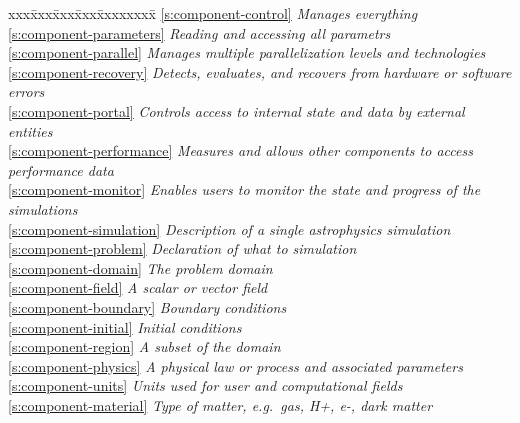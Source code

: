 \begin{tabbing}
xxx\=xxx\=xxx\=xxx\=xxxxxxxx\= \kill
\ref{s:component-control} \>           \>\>\>\> \textit{Manages everything}  \\
\ref{s:component-parameters} \>\>        \>\>\> \textit{Reading and accessing all parametrs} \\
\ref{s:component-parallel}  \>\>          \>\>\> \textit{Manages multiple parallelization levels and technologies} \\
\ref{s:component-recovery}  \>\>          \>\>\> \textit{Detects, evaluates, and recovers from hardware or software errors} \\
\ref{s:component-portal}  \>\>            \>\>\> \textit{Controls access to internal state and data by external entities} \\
\ref{s:component-performance}  \>\>       \>\>\> \textit{Measures and allows other components to access performance data} \\
\ref{s:component-monitor}  \>\>           \>\>\> \textit{Enables users to monitor the state and progress of the simulations} \\
\ref{s:component-simulation}  \>        \>\>\>\> \textit{Description of a single astrophysics simulation} \\
\ref{s:component-problem}  \>\>           \>\>\> \textit{Declaration of what to simulation} \\
\ref{s:component-domain}  \>\>\>            \>\> \textit{The problem domain} \\
\ref{s:component-field}  \>\>\>             \>\> \textit{A scalar or vector field} \\
\ref{s:component-boundary}  \>\>\>          \>\> \textit{Boundary conditions} \\
\ref{s:component-initial}  \>\>\>           \>\> \textit{Initial conditions} \\
\ref{s:component-region}  \>\>\>\>            \> \textit{A subset of the domain} \\
\ref{s:component-physics}  \>\>           \>\>\> \textit{A physical law or process and associated parameters} \\
\ref{s:component-units}  \>\>\>             \>\> \textit{Units used for user and computational fields} \\
\ref{s:component-material}  \>\>\>          \>\> \textit{Type of matter, e.g.~gas, H+, e-, dark matter} \\

\end{tabbing}
